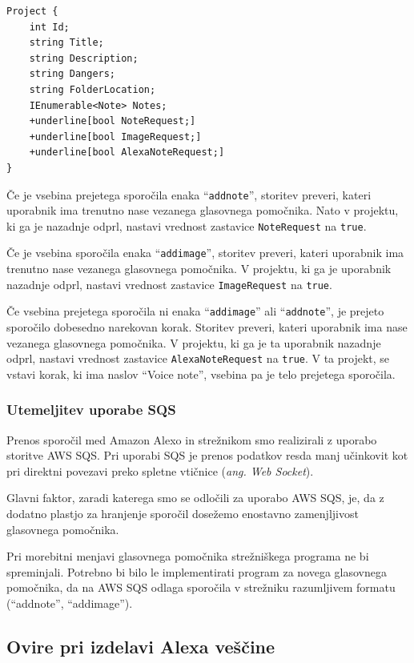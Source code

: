\documentclass[a4paper, 12pt]{book}
\begin{document}
\begin{Verbatim}[commandchars=+\[\]]
Project { 
    int Id; 
    string Title; 
    string Description; 
    string Dangers; 
    string FolderLocation; 
    IEnumerable<Note> Notes; 
    +underline[bool NoteRequest;] 
    +underline[bool ImageRequest;] 
    +underline[bool AlexaNoteRequest;] 
}
\end{Verbatim}


Če je vsebina prejetega sporočila enaka \enquote{\texttt{addnote}}, storitev preveri, kateri uporabnik ima trenutno nase vezanega glasovnega pomočnika.
Nato v projektu, ki ga je nazadnje odprl, nastavi vrednost zastavice \texttt{NoteRequest} na \texttt{true}.


Če je vsebina sporočila enaka \enquote{\texttt{addimage}}, storitev preveri, kateri uporabnik ima trenutno nase vezanega glasovnega pomočnika.
V projektu, ki ga je uporabnik nazadnje odprl, nastavi vrednost zastavice \texttt{ImageRequest} na \texttt{true}.

Če vsebina prejetega sporočila ni enaka \enquote{\texttt{addimage}} ali \enquote{\texttt{addnote}}, je prejeto sporočilo dobesedno narekovan korak.
Storitev preveri, kateri uporabnik ima nase vezanega glasovnega pomočnika.
V projektu, ki ga je ta uporabnik nazadnje odprl, nastavi vrednost zastavice \texttt{AlexaNoteRequest} na \texttt{true}.
V ta projekt, se vstavi korak, ki ima naslov \enquote{Voice note}, vsebina pa je telo prejetega sporočila.

\subsubsection{Utemeljitev uporabe SQS}

Prenos sporočil med Amazon Alexo in strežnikom smo realizirali z uporabo storitve AWS SQS.
Pri uporabi SQS je prenos podatkov resda manj učinkovit kot pri direktni povezavi preko spletne vtičnice (\textit{ang. Web Socket}).

Glavni faktor, zaradi katerega smo se odločili za uporabo AWS SQS, je, da z dodatno plastjo za hranjenje sporočil dosežemo enostavno zamenjljivost glasovnega pomočnika.

Pri morebitni menjavi glasovnega pomočnika strežniškega programa ne bi spreminjali.
Potrebno bi bilo le implementirati program za novega glasovnega pomočnika, da na AWS SQS odlaga sporočila v strežniku razumljivem formatu (\enquote{addnote}, \enquote{addimage}).


\subsection{Ovire pri izdelavi Alexa veščine}
\end{document}
